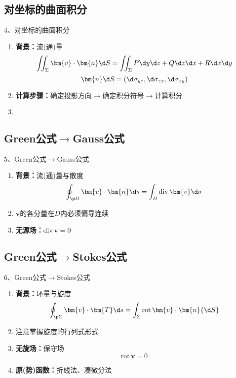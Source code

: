 \subsection{对坐标的曲面积分}

\begin{frame}[<+->]{4、对坐标的曲面积分}
	\linespread{1.2}
	\begin{enumerate}
	  \item {\bf 背景：}流(通)量
	 	$$\iint_{\Sigma}\bm{v}\cdot\bm{n}\d S=
	 	\iint_{\Sigma}P\d y\d z+Q\d z\d x+R\d x\d y$$
	 	$$\bm{n}\d S=(\d\sigma_{yz},\d\sigma_{zx},\d\sigma_{xy})$$
	  \item {\bf 计算步骤：}确定投影方向$\to$确定积分符号$\to$计算积分
	  \item {}
	\end{enumerate}
\end{frame}

\subsection{Green公式$\to$Gauss公式}

\begin{frame}[<+->]{5、Green公式$\to$Gauss公式}
	\linespread{1.2}
	\begin{enumerate}
	  \item {\bf 背景：}流(通)量与散度
	  $$\oint_{\p D}\bm{v}\cdot\bm{n}\d s=
	  \int_D{\mathrm{div}\,\bm{v}}{\d\sigma}$$
	  \item {}\alert{$\bm{v}$的各分量在$D$内必须偏导连续}
	  \item {\bf 无源场：}$\mathrm{div}\,\bm{v}=0$
	\end{enumerate}
\end{frame}

\subsection{Green公式$\to$Stokes公式}

\begin{frame}[<+->]{6、Green公式$\to$Stokes公式}
	\linespread{1.2}
	\begin{enumerate}
	  \item {\bf 背景：}环量与旋度
	  $$\oint_{\p\Sigma}\bm{v}\cdot\bm{T}\d s=
	  \int_{\Sigma}{\mathrm{rot}\,\bm{v}}\cdot\bm{n}{\d S}$$
	  \item \alert{注意掌握旋度的行列式形式}
	  \item {\bf 无旋场：}保守场
	  $$\mathrm{rot}\,\bm{v}=0$$
	  \item {\bf 原(势)函数：}折线法、凑微分法
	\end{enumerate}
\end{frame}


